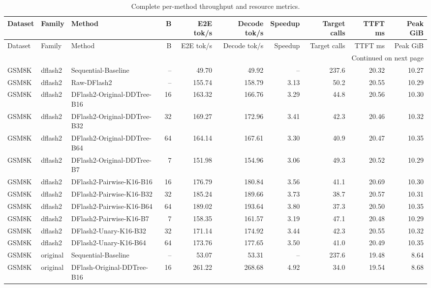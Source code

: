 
\begin{longtable}{lllrrrrrrr}
\caption{Complete per-method throughput and resource metrics.}\label{tab:all-throughput}\\
\toprule
Dataset & Family & Method & B & E2E tok/s & Decode tok/s & Speedup & Target calls & TTFT ms & Peak GiB \\
\midrule
\endfirsthead
\toprule
Dataset & Family & Method & B & E2E tok/s & Decode tok/s & Speedup & Target calls & TTFT ms & Peak GiB \\
\midrule
\endhead
\midrule
\multicolumn{10}{r}{Continued on next page}\\
\endfoot
\bottomrule
\endlastfoot
GSM8K & dflash2 & Sequential-Baseline & -- & 49.70 & 49.92 & -- & 237.6 & 20.32 & 10.27 \\
GSM8K & dflash2 & Raw-DFlash2 & -- & 155.74 & 158.79 & 3.13 & 50.2 & 20.55 & 10.29 \\
GSM8K & dflash2 & DFlash2-Original-DDTree-B16 & 16 & 163.32 & 166.76 & 3.29 & 44.8 & 20.56 & 10.30 \\
GSM8K & dflash2 & DFlash2-Original-DDTree-B32 & 32 & 169.27 & 172.96 & 3.41 & 42.3 & 20.46 & 10.32 \\
GSM8K & dflash2 & DFlash2-Original-DDTree-B64 & 64 & 164.14 & 167.61 & 3.30 & 40.9 & 20.47 & 10.35 \\
GSM8K & dflash2 & DFlash2-Original-DDTree-B7 & 7 & 151.98 & 154.96 & 3.06 & 49.3 & 20.52 & 10.29 \\
GSM8K & dflash2 & DFlash2-Pairwise-K16-B16 & 16 & 176.79 & 180.84 & 3.56 & 41.1 & 20.69 & 10.30 \\
GSM8K & dflash2 & DFlash2-Pairwise-K16-B32 & 32 & 185.24 & 189.66 & 3.73 & 38.7 & 20.57 & 10.31 \\
GSM8K & dflash2 & DFlash2-Pairwise-K16-B64 & 64 & 189.02 & 193.64 & 3.80 & 37.3 & 20.50 & 10.35 \\
GSM8K & dflash2 & DFlash2-Pairwise-K16-B7 & 7 & 158.35 & 161.57 & 3.19 & 47.1 & 20.48 & 10.29 \\
GSM8K & dflash2 & DFlash2-Unary-K16-B32 & 32 & 171.14 & 174.92 & 3.44 & 42.3 & 20.55 & 10.32 \\
GSM8K & dflash2 & DFlash2-Unary-K16-B64 & 64 & 173.76 & 177.65 & 3.50 & 41.0 & 20.49 & 10.35 \\
GSM8K & original & Sequential-Baseline & -- & 53.07 & 53.31 & -- & 237.6 & 19.48 & 8.64 \\
GSM8K & original & DFlash-Original-DDTree-B16 & 16 & 261.22 & 268.68 & 4.92 & 34.0 & 19.54 & 8.68 \\

\end{longtable}
